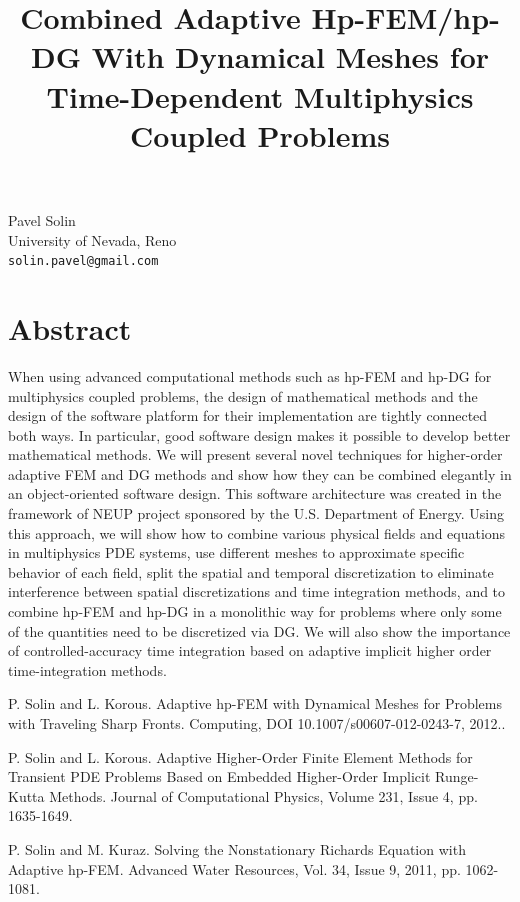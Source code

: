 \documentclass[article, A4, 11pt]{llncs}%
\begin{document}
\title{Combined Adaptive Hp-FEM/hp-DG With Dynamical Meshes for Time-Dependent Multiphysics Coupled Problems}
 \author{} \institute{}
\maketitle
\begin{center}
{\large Pavel Solin}\\
University of Nevada, Reno\\
{\tt solin.pavel@gmail.com}
\end{center}

\section*{Abstract}
When using advanced computational methods such as hp-FEM and hp-DG for multiphysics coupled problems, the design of mathematical methods and the design of the software platform for their implementation are tightly connected both ways. In particular, good software design makes it possible to develop better mathematical methods. We will present several novel techniques for higher-order adaptive FEM and DG methods and show how they can be combined elegantly in an object-oriented software design. This software architecture was created in the framework of NEUP project sponsored by the U.S. Department of Energy. Using this approach, we will show how to combine various physical fields and equations in multiphysics PDE systems, use different meshes to approximate specific behavior of each field, split the spatial and temporal discretization to eliminate interference between spatial discretizations and time integration methods, and to combine hp-FEM and hp-DG in a monolithic way for problems where only some of the quantities need to be discretized via DG. We will also show the importance of controlled-accuracy time integration based on adaptive implicit higher order time-integration methods.


\begin{thebibliography}{10}
{\sc P. Solin and L. Korous}. {Adaptive hp-FEM with Dynamical Meshes for Problems with Traveling Sharp Fronts}. Computing, DOI 10.1007/s00607-012-0243-7, 2012..

{\sc P. Solin and L. Korous}. {Adaptive Higher-Order Finite Element Methods for Transient PDE Problems Based on Embedded Higher-Order Implicit Runge-Kutta Methods}. Journal of Computational Physics, Volume 231, Issue 4, pp. 1635-1649.

{\sc P. Solin and M. Kuraz}. {Solving the Nonstationary Richards Equation with Adaptive hp-FEM}. Advanced Water Resources, Vol. 34, Issue 9, 2011, pp. 1062-1081.
\end{thebibliography} %
\end{document}
